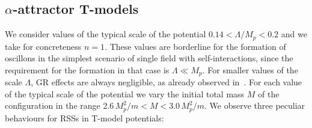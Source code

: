 \documentclass[11pt,a4paper]{article}
\begin{document}
\subsection{$\alpha$-attractor T-models}

We consider values of the typical scale of the potential $0.14 < \Lambda/M_p < 0.2$ and we take for concreteness $n = 1$. These values are borderline for the formation of oscillons in the simplest scenario of single field with self-interactions, since the requirement for the formation in that case is $\Lambda \ll M_p$. For smaller values of the scale $\Lambda$, GR effects are always negligible, as already observed in~\cite{Amin:2019ums}. For each value of the typical scale of the potential we vary the initial total mass $M$ of the configuration in the range $2.6 \, M_p^2/m < M < 3.0 \, M_p^2/m$. We observe three peculiar behaviours for RSSs in T-model potentials:
\end{document}
